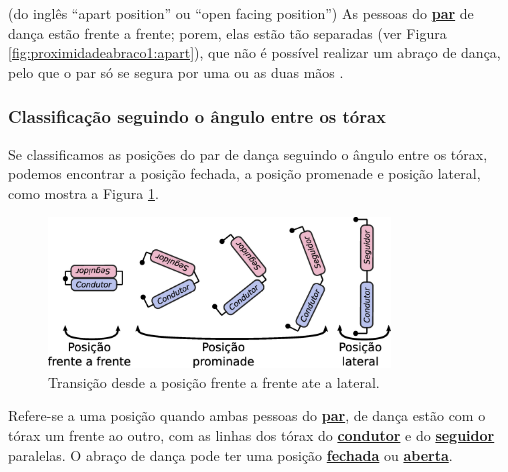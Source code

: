 \begin{definition}
\label{def:apart-position} (do inglês ``apart position'' ou ``open facing position'') 
As pessoas do \hyperref[def:Par]{\textbf{par}} de dança estão frente a frente;
porem, elas estão tão separadas (ver Figura \ref{fig:proximidadeabraco1:apart}), 
que não é possível realizar um abraço de dança, 
pelo que o par só se segura por uma ou as duas mãos \cite{fletsher2015improve} \cite[pp. 14]{BallroomDancing1992}.
\end{definition}

\subsubsection{Classificação seguindo o ângulo entre os tórax}
Se classificamos as posições do par de dança seguindo o ângulo entre os tórax,
podemos encontrar a posição fechada, 
a posição promenade e posição lateral, como mostra a Figura \ref{fig:desenhando}.
\begin{figure}[!ht]
     \centering
\includegraphics[width=0.81\textwidth]{chapters/cap-normas/desenhando.eps}
\caption{Transição desde a posição frente a frente ate a lateral.}
\label{fig:desenhando}
\end{figure}


\begin{definition}
\label{def:frente-frente-position} 
Refere-se a uma posição quando ambas pessoas do \hyperref[def:Par]{\textbf{par}}, 
de dança estão com o tórax um frente ao outro,
com as linhas dos tórax do 
\hyperref[def:Condutor]{\textbf{condutor}} e do
\hyperref[def:Seguidor]{\textbf{seguidor}} paralelas.
O abraço de dança pode ter uma posição \hyperref[def:closed-position]{\textbf{fechada}} 
ou \hyperref[def:open-position]{\textbf{aberta}}.
\end{definition}



